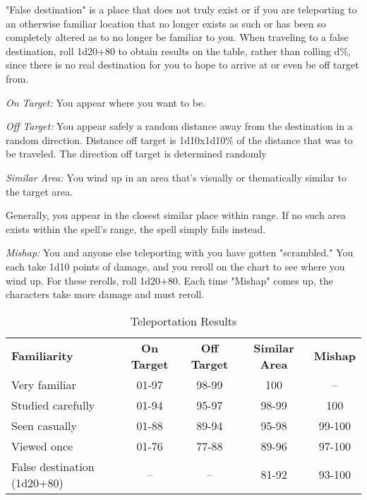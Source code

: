 "False destination" is a place that does not truly exist or if you are teleporting 
to an otherwise familiar location that no longer exists as such or has been so 
completely altered as to no longer be familiar to you. When traveling to a false 
destination, roll 1d20+80 to obtain results on the table, rather than rolling d\%, 
since there is no real destination for you to hope to arrive at or even be off 
target from.

\textit{On Target:} You appear where you want to be.

\textit{Off Target:} You appear safely a random distance away from the destination 
in a random direction. Distance off target is 1d10x1d10\% of the distance that 
was to be traveled. The direction off target is determined randomly

\textit{Similar Area:} You wind up in an area that's visually or thematically similar 
to the target area.

Generally, you appear in the closest similar place within range. If no such area 
exists within the spell's range, the spell simply fails instead.

\textit{Mishap:} You and anyone else teleporting with you have gotten "scrambled." 
You each take 1d10 points of damage, and you reroll on the chart to see where you 
wind up. For these rerolls, roll 1d20+80. Each time "Mishap" comes up, the characters 
take more damage and must reroll.

\begin{table}[htb]
\caption{Teleportation Results}
\centering
\begin{tabular}{l c c c c}
\textbf{Familiarity} & \textbf{On Target} & \textbf{Off Target} & \textbf{Similar Area} & \textbf{Mishap}\\
Very familiar & 01-97 & 98-99 & 100 & --\\
Studied carefully & 01-94 & 95-97 & 98-99 & 100\\
Seen casually & 01-88 & 89-94 & 95-98 & 99-100\\
Viewed once & 01-76 & 77-88 & 89-96 & 97-100\\
False destination (1d20+80) & -- & -- & 81-92 & 93-100\\
\end{tabular}
\end{table}
